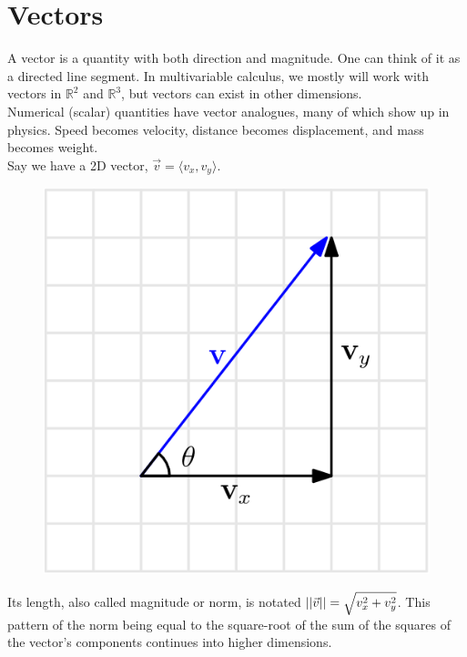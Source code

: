 \section{Vectors}
\noindent
A vector is a quantity with both direction and magnitude. One can think of it as a directed line segment. In multivariable calculus, we mostly will work with vectors in $\mathbb{R}^2$ and $\mathbb{R}^3$, but vectors can exist in other dimensions.\\

\noindent
Numerical (scalar) quantities have vector analogues, many of which show up in physics. Speed becomes velocity, distance becomes displacement, and mass becomes weight.\\

\noindent
Say we have a 2D vector, $\vec{v} = \langle v_x, v_y \rangle$.

\begin{figure}[h]
	\centering
	\includegraphics[scale=0.5]{Images/backgroundReview/VectorAddition}
\end{figure}

\noindent
Its length, also called magnitude or norm, is notated $\left|\left|\vec{v}\right|\right| = \sqrt{v_x^2+v_y^2}$. This pattern of the norm being equal to the square-root of the sum of the squares of the vector's components continues into higher dimensions.\\

